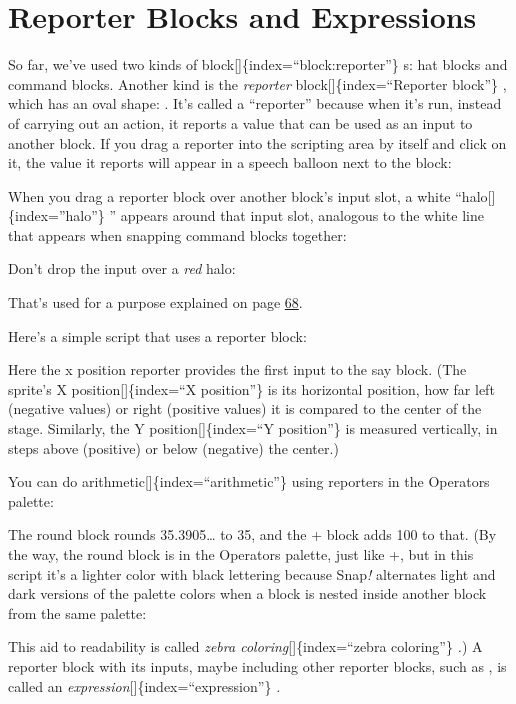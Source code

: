 \documentclass[
  letterpaper,
]{book}
\begin{document}
\section{Reporter Blocks and
Expressions}\label{reporter-blocks-and-expressions}

So far, we've used two kinds of block{[}{]}\{index=``block:reporter''\}
s: hat blocks and command blocks. Another kind is the \emph{reporter}
block{[}{]}\{index=``Reporter block''\} , which has an oval shape: .
It's called a ``reporter'' because when it's run, instead of carrying
out an action, it reports a value that can be used as an input to
another block. If you drag a reporter into the scripting area by itself
and click on it, the value it reports will appear in a speech balloon
next to the block:

When you drag a reporter block over another block's input slot, a white
``halo{[}{]}\{index=''halo''\} '' appears around that input slot,
analogous to the white line that appears when snapping command blocks
together:

Don't drop the input over a \emph{red} halo:

That's used for a purpose explained on page
\hyperref[recursive-calls-to-multiple-input-blocks]{68}.

Here's a simple script that uses a reporter block:

Here the x position reporter provides the first input to the say block.
(The sprite's X position{[}{]}\{index=``X position''\} is its horizontal
position, how far left (negative values) or right (positive values) it
is compared to the center of the stage. Similarly, the Y
position{[}{]}\{index=``Y position''\} is measured vertically, in steps
above (positive) or below (negative) the center.)

You can do arithmetic{[}{]}\{index=``arithmetic''\} using reporters in
the Operators palette:

The round block rounds 35.3905\ldots{} to 35, and the + block adds 100
to that. (By the way, the round block is in the Operators palette, just
like +, but in this script it's a lighter color with black lettering
because Snap\emph{!} alternates light and dark versions of the palette
colors when a block is nested inside another block from the same
palette:

This aid to readability is called \emph{zebra
coloring}{[}{]}\{index=``zebra coloring''\} \emph{.}) A reporter block
with its inputs, maybe including other reporter blocks, such as , is
called an \emph{expression}{[}{]}\{index=``expression''\} \emph{.}
\end{document}
